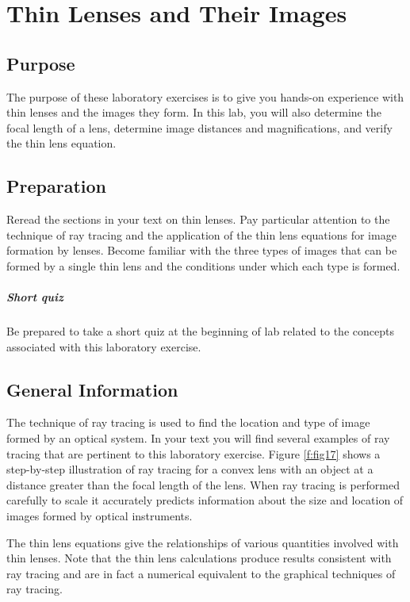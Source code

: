 \chapter{Thin Lenses and Their Images}

\section{Purpose}
  The purpose of these laboratory exercises is to give you hands-on experience with thin lenses and the images they form. In this lab, you will also determine the focal length of a lens, determine image distances and magnifications, and verify the thin lens equation.
  

\section{Preparation}
Reread the sections in your text on thin lenses.  Pay particular attention to the technique of ray tracing and the application of the thin lens equations for image formation by lenses.  Become familiar with the three types of images that can be formed by a single thin lens and the conditions under which each type is formed.

\paragraph{Short quiz}
  Be prepared to take a short quiz at the beginning of lab related to the concepts associated with this laboratory exercise.

\section{General Information}

The technique of ray tracing is used to find the location and type of image formed by an optical system. In your text you will find several examples of ray tracing that are pertinent to this laboratory exercise. Figure \ref{f:fig17} shows a step-by-step illustration of ray tracing for a convex lens with an object at a distance greater than the focal length of the lens.  When ray tracing is performed carefully to scale it accurately predicts information about the size and location of images formed by optical instruments.

The thin lens equations give the relationships of various quantities involved with thin lenses.  Note that the thin lens calculations produce results consistent with ray tracing and are in fact a numerical equivalent to the graphical techniques of ray tracing.

